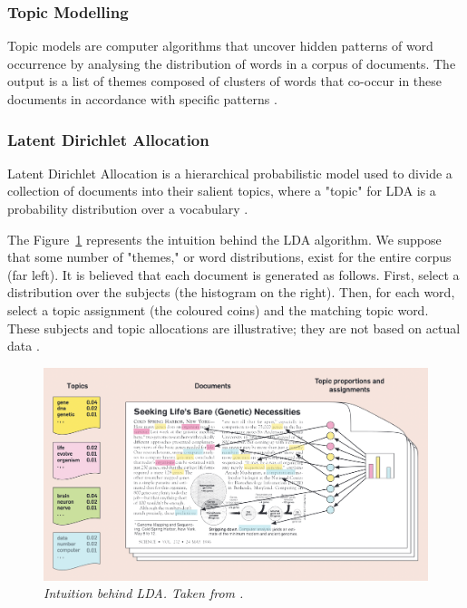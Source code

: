 \documentclass[twoside,12pt,a4paper]{article}
\begin{document}
\subsubsection{Topic Modelling}
Topic models are computer algorithms that uncover hidden patterns of word occurrence by analysing the distribution of words in a corpus of documents. The output is a list of themes composed of clusters of words that co-occur in these documents in accordance with specific patterns \citep{jacobi_quantitative_2016}. 

\subsubsection{Latent Dirichlet Allocation}
Latent Dirichlet Allocation is a hierarchical probabilistic model used to divide a collection of documents into their salient topics, where a "topic" for LDA is a probability distribution over a vocabulary \citep{blei_probabilistic_2012}.

The Figure~\ref{fig:lda} represents the intuition behind the LDA algorithm. We suppose that some number of "themes," or word distributions, exist for the entire corpus (far left).
It is believed that each document is generated as follows. First, select a distribution over the subjects (the histogram on the right). Then, for each word, select a topic assignment (the coloured coins) and the matching topic word. These subjects and topic allocations are illustrative; they are not based on actual data \citep{blei_probabilistic_2012}.

\begin{figure}[h]
\centering
\includegraphics[scale=0.4]{lda.png}
\caption{\textit{Intuition behind LDA. Taken from \citep{blei_probabilistic_2012}.}}
\label{fig:lda}
\end{figure}
\end{document}
